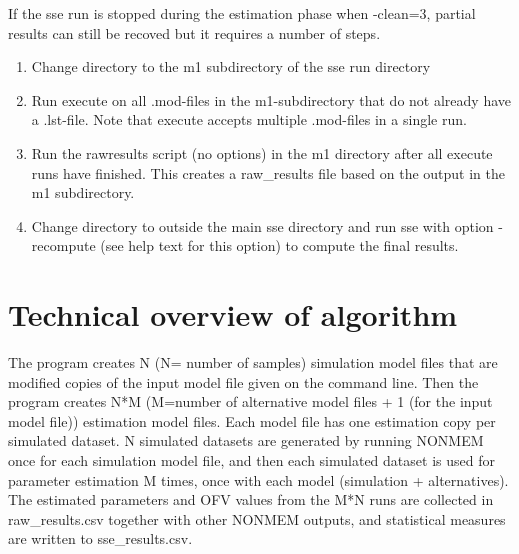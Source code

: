 If the sse run is stopped during the estimation phase when -clean=3, 
partial results can still be recoved but it requires a number of steps.
\begin{enumerate}
\item Change directory to the m1 subdirectory of the sse run directory
\item Run execute on all .mod-files in the m1-subdirectory that do not already have a .lst-file. Note that execute accepts multiple .mod-files in a single run.
\item Run the rawresults script (no options) in the m1 directory after all execute runs have finished.
This creates a raw\_results file based on the output in the m1 subdirectory.
\item Change directory to outside the main sse directory and run sse with option -recompute (see help text for this option) to compute the final results.
\end{enumerate}

\section{Technical overview of algorithm}
The program creates N (N= number of samples) simulation model files that are modified copies of the input model file given on the command line. Then the program creates N*M (M=number of alternative model files + 1 (for the input model file)) estimation model files. Each model file has one estimation copy per simulated dataset. N simulated datasets are generated by running NONMEM once for each simulation model file, and then each simulated dataset is used for parameter estimation M times, once with each model (simulation + alternatives). The estimated parameters and OFV values from the M*N runs are collected in raw\_results.csv together with other NONMEM outputs, and statistical measures are written to sse\_results.csv. 

